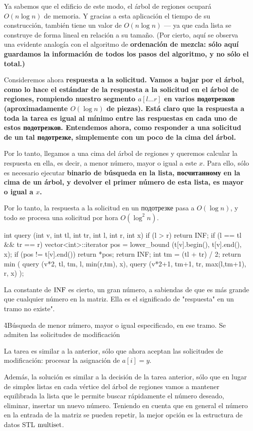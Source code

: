 Ya sabemos que el edificio de este modo, el árbol de regiones ocupará $O (n \log n)$ de memoria. Y gracias a esta aplicación el tiempo de su construcción, también tiene un valor de $O (n \log n)$ --- ya que cada lista se construye de forma lineal en relación a su tamaño. (Por cierto, aquí se observa una evidente analogía con el algoritmo de \bf{ordenación de mezcla}: sólo aquí guardamos la información de todos los pasos del algoritmo, y no sólo el total.)

Consideremos ahora \bf{respuesta a la solicitud}. Vamos a bajar por el árbol, como lo hace el estándar de la respuesta a la solicitud en el árbol de regiones, rompiendo nuestro segmento $a[l \ldots r]$ en varios подотрезков (aproximadamente $O (\log n)$ de piezas). Está claro que la respuesta a toda la tarea es igual al mínimo entre las respuestas en cada uno de estos подотрезков. Entendemos ahora, como responder a una solicitud de un tal подотрезке, simplemente con un poco de la cima del árbol.

Por lo tanto, llegamos a una cima del árbol de regiones y queremos calcular la respuesta en ella, es decir, a menor número, mayor o igual a este $x$. Para ello, sólo es necesario ejecutar \bf{binario de búsqueda} en la lista, посчитанному en la cima de un árbol, y devolver el primer número de esta lista, es mayor o igual a $x$.

Por lo tanto, la respuesta a la solicitud en un подотрезке pasa a $O (\log n)$, y todo se procesa una solicitud por hora $O (\log^2 n)$.

\code
int query (int v, int tl, int tr, int l, int r, int x) {
if (l > r)
return INF;
if (l == tl && tr == r) {
vector<int>::iterator pos = lower_bound (t[v].begin(), t[v].end(), x);
if (pos != t[v].end())
return *pos;
return INF;
}
int tm = (tl + tr) / 2;
return min (
query (v*2, tl, tm, l, min(r,tm), x),
query (v*2+1, tm+1, tr, max(l,tm+1), r, x)
);
}
\endcode

La constante de $\rm INF$ es cierto, un gran número, a sabiendas de que es más grande que cualquier número en la matriz. Ella es el significado de "respuesta" en un tramo no existe".

\h4{Búsqueda de menor número, mayor o igual especificado, en ese tramo. Se admiten las solicitudes de modificación}

La tarea es similar a la anterior, sólo que ahora aceptan las solicitudes de modificación: procesar la asignación de $a[i] = y$.

Además, la solución es similar a la decisión de la tarea anterior, sólo que en lugar de simples listas en cada vértice del árbol de regiones vamos a mantener equilibrada la lista que le permite buscar rápidamente el número deseado, eliminar, insertar un nuevo número. Teniendo en cuenta que en general el número en la entrada de la matriz se pueden repetir, la mejor opción es la estructura de datos STL $\rm multiset$.

